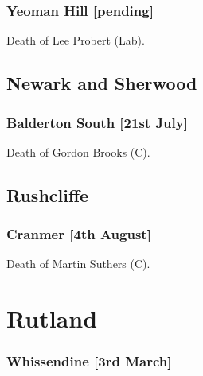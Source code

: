\documentclass[a4paper,openany]{book}
\begin{document}
\begin{resultsiii}
\subsubsection*{Yeoman Hill \hspace*{\fill}\nolinebreak[1]%
\enspace\hspace*{\fill}
[pending]}


Death of Lee Probert (Lab).

\subsection*{Newark and Sherwood}

\subsubsection*{Balderton South \hspace*{\fill}\nolinebreak[1]%
\enspace\hspace*{\fill}
[21st July]}


Death of Gordon Brooks (C).

\subsection*{Rushcliffe}

\subsubsection*{Cranmer \hspace*{\fill}\nolinebreak[1]%
\enspace\hspace*{\fill}
[4th August]}


Death of Martin Suthers (C).

\section{Rutland}

\subsubsection*{Whissendine \hspace*{\fill}\nolinebreak[1]%
\enspace\hspace*{\fill}
[3rd March]}


\end{resultsiii}
\end{document}
